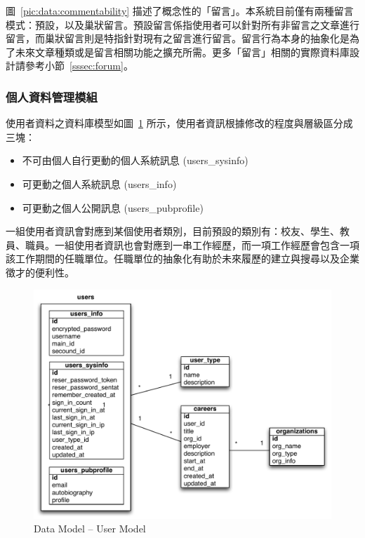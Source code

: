圖~\ref{pic:data:commentability} 描述了概念性的「留言」。本系統目前僅有兩種留言模式：預設，以及巢狀留言。預設留言係指使用者可以針對所有非留言之文章進行留言，而巢狀留言則是特指針對現有之留言進行留言。留言行為本身的抽象化是為了未來文章種類或是留言相關功能之擴充所需。更多「留言」相關的實際資料庫設計請參考小節~\ref{sssec:forum}。

\subsubsection{個人資料管理模組}
\label{sssec:userprofile}
使用者資料之資料庫模型如圖~\ref{pic:data:user} 所示，使用者資訊根據修改的程度與層級區分成三塊：
\begin{itemize}
\item 不可由個人自行更動的個人系統訊息 (users\_sysinfo)
\item 可更動之個人系統訊息 (users\_info)
\item 可更動之個人公開訊息 (users\_pubprofile)
\end{itemize}
一組使用者資訊會對應到某個使用者類別，目前預設的類別有：校友、學生、教員、職員。一組使用者資訊也會對應到一串工作經歷，而一項工作經歷會包含一項該工作期間的任職單位。任職單位的抽象化有助於未來履歷的建立與搜尋以及企業徵才的便利性。

\begin{figure}[h]
\centering
\includegraphics[width=1.05\textwidth]{img/user.pdf}
\caption{Data Model -- User Model}
\label{pic:data:user}
\end{figure}

